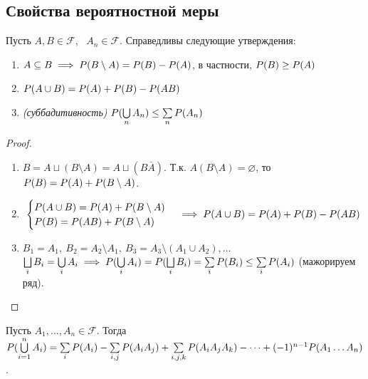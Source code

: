     \subsection{Свойства вероятностной меры}
        \begin{theorem}\label{lect02:th1}
            Пусть $A, B \in \mathcal{F}$, \ $A_n \in \mathcal{F}$. Справедливы следующие утверждения:
            \begin{enumerate}
                \item $A \subseteq B \implies \P(B \setminus A) = \P(B) - \P(A)$, в частности, $\P(B) \geq \P(A)$
                \item $\P(A \cup B) = \P(A) + \P(B) - \P(AB)$
                \item \emph{(суббадитивность)} $\P(\bigcup\limits_n A_n) \leq \sum\limits_n \P(A_n)$
            \end{enumerate}
        \end{theorem}
        \begin{proof}
            \begin{enumerate}
                \item $B = A \sqcup (B \setminus A) = A \sqcup (B\overline{A})$. Т.к. $A(B \setminus A) = \varnothing$, то $\P(B) = \P(A) + \P(B \setminus A)$.
                \item \begin{equation*}
                    \begin{cases}
                        \P(A \cup B) = \P(A) + \P(B \setminus A)\\
                        \P(B) = \P(AB) + \P(B \setminus A)
                    \end{cases} \implies \P(A \cup B) = \P(A) + \P(B) - \P(AB)
                \end{equation*}
                \item $B_1 = A_1, \ B_2 = A_2 \setminus A_1, \ B_3 = A_3 \setminus (A_1 \cup A_2), \dots$\\
                $\bigsqcup\limits_i B_i = \bigcup\limits_i A_i \implies \P(\bigcup\limits_i A_i) = \P(\bigsqcup\limits_i B_i) = \sum\limits_i \P(B_i) \leq \sum\limits_i \P(A_i)$ (мажорируем ряд).
            \end{enumerate}
        \end{proof}
        \begin{theorem}\label{lect02:th2}
            Пусть $A_1, \dots, A_n \in \mathcal{F}$. Тогда $\P(\bigcup\limits_{i = 1}^n A_i) = \sum\limits_i \P(A_i) - \sum\limits_{i, j} \P(A_iA_j) + \sum\limits_{i, j, k} \P(A_iA_jA_k) - \dots + (-1)^{n - 1}\P(A_1\dots A_n)$.
        \end{theorem}
